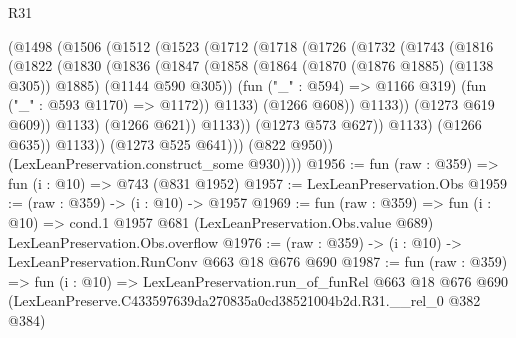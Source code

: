 \begin{lexlean}{R31}
\begin{coremodule}
                  (@1498
                    (@1506
                      (@1512
                        (@1523
                          (@1712
                            (@1718
                              (@1726
                                (@1732
                                  (@1743
                                    (@1816
                                      (@1822
                                        (@1830
                                          (@1836
                                            (@1847
                                              (@1858
                                                (@1864 (@1870 (@1876 @1885) (@1138 @305)) @1885)
                                                (@1144 @590 @305))
                                              (fun ("_" : @594) => @1166 @319)
                                              (fun ("_" : @593 @1170) => @1172))
                                            @1133)
                                          (@1266 @608))
                                        @1133))
                                    (@1273 @619 @609))
                                  @1133)
                                (@1266 @621))
                              @1133))
                          (@1273 @573 @627))
                        @1133)
                      (@1266 @635))
                    @1133))
                (@1273 @525 @641)))
            (@822 @950))
          (LexLeanPreservation.construct_some @930))))
@1956 := fun (raw : @359) => fun (i : @10) => @743 (@831 @1952)
@1957 := LexLeanPreservation.Obs
@1959 := (raw : @359) -> (i : @10) -> @1957
@1969 := fun (raw : @359) =>
  fun (i : @10) =>
  cond.{1} @1957 @681 (LexLeanPreservation.Obs.value @689) LexLeanPreservation.Obs.overflow
@1976 := (raw : @359) -> (i : @10) -> LexLeanPreservation.RunConv @663 @18 @676 @690
@1987 := fun (raw : @359) =>
  fun (i : @10) =>
  LexLeanPreservation.run_of_funRel
    @663
    @18
    @676
    @690
    (LexLeanPreserve.C433597639da270835a0cd38521004b2d.R31.__rel_0 @382 @384)
\end{coremodule}
\end{lexlean}
